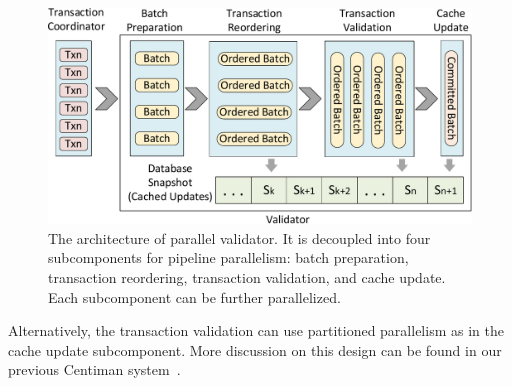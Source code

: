 \begin{figure}[t]
	\centering
	\includegraphics[width=1\columnwidth]{./figures/validator}
	\vspace{-1em}
	\caption{The architecture of parallel validator. It is decoupled into four subcomponents for pipeline parallelism: batch preparation, transaction reordering, transaction validation, and cache update. Each subcomponent can be further parallelized.}
	\vspace{-1em}
	\label{fig:reorder:validator}
\end{figure}

Alternatively, the transaction validation can use partitioned parallelism as in the cache update subcomponent. More discussion on this design can be found in our previous Centiman system~\cite{ding2015centiman}.


